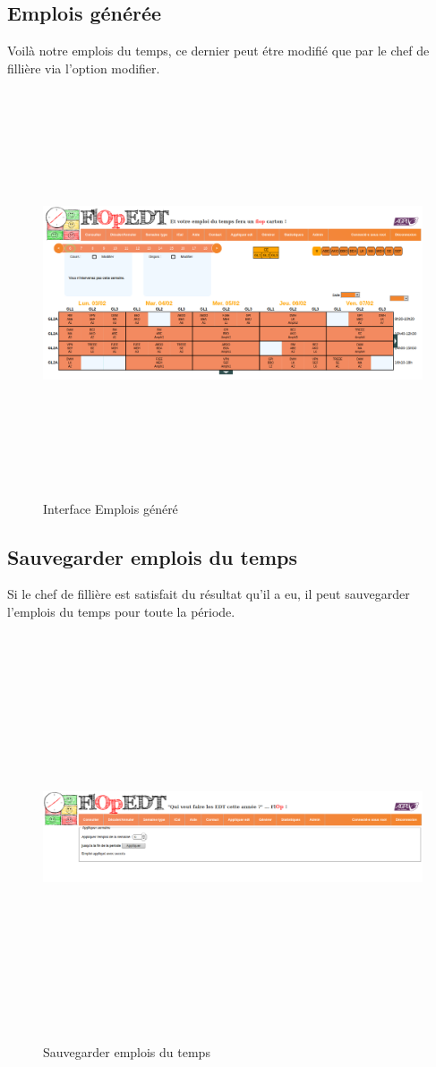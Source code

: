 \subsection*{Emplois générée}
Voilà notre emplois du temps, ce dernier peut étre modifié que par le chef de fillière via l'option modifier.
\begin{figure}[H]
      \centering
        \includegraphics[width=15cm,height=12cm]{img/5.png}
        \caption{Interface Emplois généré}
\end{figure}
\newpage
\subsection*{Sauvegarder emplois du temps}
Si le chef de fillière est satisfait du résultat qu'il a eu, il peut sauvegarder l'emplois du temps pour toute la période.
\begin{figure}[H]
      \centering
        \includegraphics[width=15cm,height=12cm]{img/6.png}
        \caption{Sauvegarder emplois du temps}
\end{figure}
\newpage

